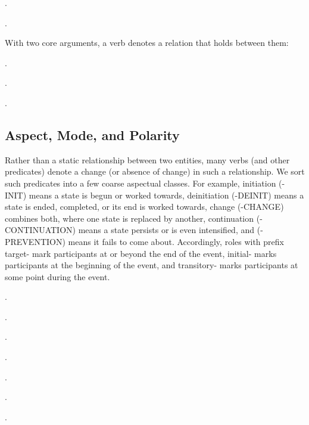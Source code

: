 \documentclass[a4paper]{article}
\newcommand{\frs}[1]{\mbox{\textsf{#1}}} %
\newcommand{\rl}[1]{\textsf{#1}}
\begin{document}
\ex.

\ex.

With two core arguments, a verb denotes a relation that holds between them:

\ex.

\ex.

\ex.

\newpage\subsection{Aspect, Mode, and Polarity}
\label{sec:aspect-mode-polarity}

Rather than a static relationship between two entities, many verbs (and other
predicates) denote a change (or absence of change) in such a relationship. We
sort such predicates into a few coarse aspectual classes. For example,
initiation (\frs{-INIT}) means a state is begun or worked towards, deinitiation
(\frs{-DEINIT}) means a state is ended, completed, or its end is worked
towards, change (\frs{-CHANGE}) combines both, where one state is replaced by
another, continuation (\frs{-CONTINUATION}) means a state persists or is even
intensified, and (\frs{-PREVENTION}) means it fails to come about.
Accordingly, roles with prefix \rl{target-} mark participants at or beyond the
end of the event, \rl{initial-} marks participants at the beginning of the
event, and \rl{transitory-} marks participants at some point during the event.

\ex.

\ex.

\ex.

\ex.

\ex.

\ex.\label{ex:fall}

\ex.
\end{document}
